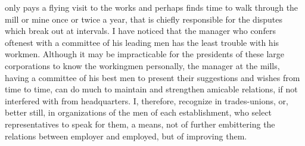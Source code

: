\documentclass[11pt,openany]{book}
\begin{document}
only pays a flying visit to the works and perhaps finds time to walk through the mill or mine once or twice a year, that is chiefly responsible for the disputes which break out at intervals. I have noticed that the manager who confers oftenest with a committee of his leading men has the least trouble with his workmen. Although it may be impracticable for the presidents of these large corporations to know the workingmen personally, the manager at the mills, having a committee of his best men to present their suggestions and wishes from time to time, can do much to maintain and strengthen amicable relations, if not interfered with from headquarters. I, therefore, recognize in trades-unions, or, better still, in organizations of the men of each establishment, who select representatives to speak for them, a means, not of further embittering the relations between employer and employed, but of improving them.
\end{document}
